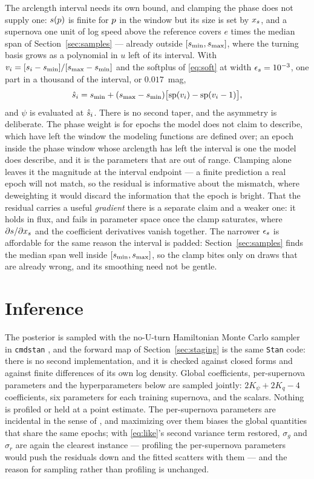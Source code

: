 \documentclass[11pt]{article}
\theoremstyle{plain}
\begin{document}
The arclength interval needs its own bound, and clamping the phase does not supply one:
$s(p)$ is finite for $p$ in the window but its size is set by $x_{s}$, and
a supernova one unit of log speed above the reference covers $e$ times the median span of
Section~\ref{sec:samples} --- already outside $[s_{\min}, s_{\max}]$, where the turning
basis grows as a polynomial in $u$ left of its interval. With
$v_{i} = [s_{i} - s_{\min}]/[s_{\max} - s_{\min}]$ and the softplus of
\eqref{eq:soft} at width $\epsilon_{s} = 10^{-3}$, one part in a thousand of the
interval, or $0.017$~mag,
\begin{equation}
  \hat{s}_{i} = s_{\min} + (s_{\max} - s_{\min})
    \bigl[\mathrm{sp}(v_{i}) - \mathrm{sp}(v_{i}-1)\bigr] ,
  \label{eq:softarc}
\end{equation}
and $\psi$ is evaluated at $\hat{s}_{i}$. There is no second taper, and the asymmetry is
deliberate. The phase weight is for epochs the model does not claim to describe, which have
left the window the modeling functions are defined over; an epoch inside the phase window
whose arclength has left the interval is one the model does describe, and it is the
parameters that are out of range. Clamping alone leaves it the magnitude at the interval
endpoint --- a finite prediction a real epoch will not match, so the residual is informative
about the mismatch, where deweighting it would discard the information that the epoch is
bright. That the residual carries a useful \emph{gradient} there is a separate claim and a
weaker one: it holds in flux, and fails in parameter space once the clamp saturates, where
$\partial s/\partial x_{s}$ and the coefficient derivatives vanish together. The narrower $\epsilon_{s}$ is affordable for the
same reason the interval is padded: Section~\ref{sec:samples} finds the median span well
inside $[s_{\min}, s_{\max}]$, so the clamp bites only on draws that are already wrong,
and its smoothing need not be gentle.


\section{Inference}
\label{sec:inference}

The posterior is sampled with the no-U-turn Hamiltonian Monte Carlo sampler
\citep{Hoffman2011} in \texttt{cmdstan} \citep{Carpenter2017}, and the forward map of
Section~\ref{sec:staging} is the same \texttt{Stan} code: there is no second implementation,
and it is checked against closed forms and against finite differences of its own log
density. Global coefficients, per-supernova parameters and the hyperparameters below
are sampled jointly: $2K_{\psi} + 2K_{q} - 4$ coefficients, six parameters for each
training supernova, and the scalars. Nothing is profiled or held at a point estimate. The
per-supernova parameters are incidental in the sense of \citet{Neyman1948}, and maximizing
over them biases the global quantities that share the same epochs; with
\eqref{eq:like}'s second variance term restored, $\sigma_{g}$ and $\sigma_{r}$ are again
the clearest instance --- profiling the per-supernova parameters would push the residuals
down and the fitted scatters with them --- and the reason for sampling rather than
profiling is unchanged.
\end{document}
